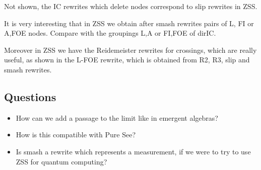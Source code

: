 \documentclass[]{article}
\begin{document}
Not shown, the IC rewrites which delete nodes correspond to slip
rewrites in ZSS.

It is very interesting that in ZSS we obtain after smash rewrites pairs
of L, FI or A,FOE nodes. Compare with the groupings L,A or FI,FOE of
dirIC.

Moreover in ZSS we have the Reidemeister rewrites for crossings, which
are really useful, as shown in the L-FOE rewrite, which is obtained from
R2, R3, slip and smash rewrites.

\hypertarget{questions}{%
\subsection{Questions}\label{questions}}

\begin{itemize}
\item
  How can we add a passage to the limit like in emergent algebras?
\item
  How is this compatible with Pure See?
\item
  Is smash a rewrite which represents a measurement, if we were to try
  to use ZSS for quantum computing?
\end{itemize}
\end{document}
